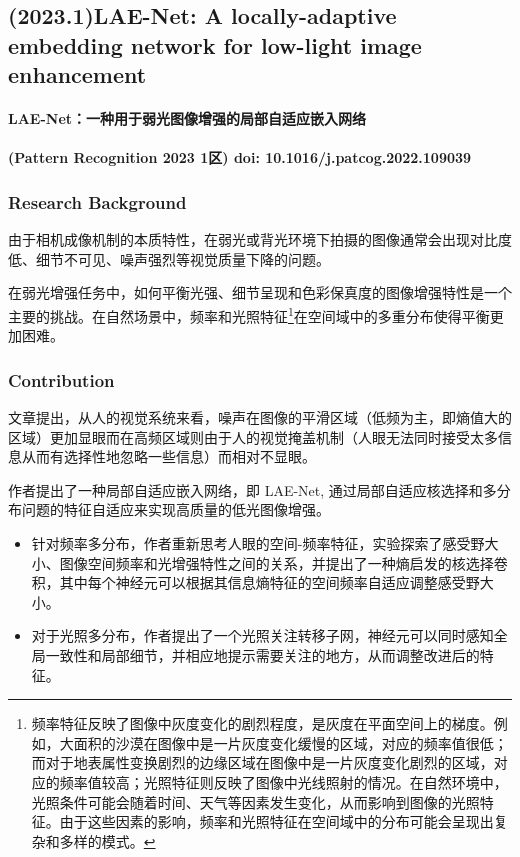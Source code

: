 \documentclass[a4paper]{ctexart}
\begin{document}
	\subsection{(2023.1)LAE-Net: A locally-adaptive embedding network for low-light image enhancement}
	
	\paragraph{LAE-Net：一种用于弱光图像增强的局部自适应嵌入网络}
	
	\paragraph{(Pattern Recognition 2023 1区) doi: 10.1016/j.patcog.2022.109039}
	
	\subsubsection{Research Background}
	
	由于相机成像机制的本质特性，在弱光或背光环境下拍摄的图像通常会出现对比度低、细节不可见、噪声强烈等视觉质量下降的问题。
	
	在弱光增强任务中，如何平衡光强、细节呈现和色彩保真度的图像增强特性是一个主要的挑战。在自然场景中，频率和光照特征\footnote{频率特征反映了图像中灰度变化的剧烈程度，是灰度在平面空间上的梯度。例如，大面积的沙漠在图像中是一片灰度变化缓慢的区域，对应的频率值很低；而对于地表属性变换剧烈的边缘区域在图像中是一片灰度变化剧烈的区域，对应的频率值较高；光照特征则反映了图像中光线照射的情况。在自然环境中，光照条件可能会随着时间、天气等因素发生变化，从而影响到图像的光照特征。由于这些因素的影响，频率和光照特征在空间域中的分布可能会呈现出复杂和多样的模式。}在空间域中的多重分布使得平衡更加困难。
	
	\subsubsection{Contribution}
	
	文章提出，从人的视觉系统来看，噪声在图像的平滑区域（低频为主，即熵值大的区域）更加显眼而在高频区域则由于人的视觉掩盖机制（人眼无法同时接受太多信息从而有选择性地忽略一些信息）而相对不显眼。
	
	作者提出了一种局部自适应嵌入网络，即 LAE-Net, 通过局部自适应核选择和多分布问题的特征自适应来实现高质量的低光图像增强。
	
	\begin{itemize}
		\item[(1)] 
		针对频率多分布，作者重新思考人眼的空间-频率特征，实验探索了感受野大小、图像空间频率和光增强特性之间的关系，并提出了一种熵启发的核选择卷积，其中每个神经元可以根据其信息熵特征的空间频率自适应调整感受野大小。
		
		\item[(2)]
		对于光照多分布，作者提出了一个光照关注转移子网，神经元可以同时感知全局一致性和局部细节，并相应地提示需要关注的地方，从而调整改进后的特征。
		
	\end{itemize}	
	
\end{document}

